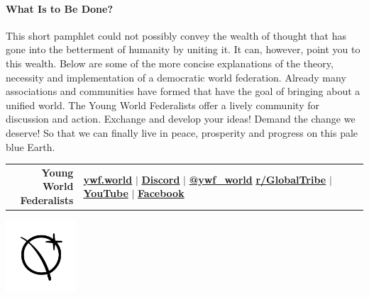 \documentclass[11pt,a4paper]{article}
\begin{document}
\paragraph{What Is to Be Done?}

This short pamphlet could not possibly convey the wealth of thought that has gone into the betterment of humanity by uniting it.
It can, however, point you to this wealth.
Below are some of the more concise explanations of the theory, necessity and implementation of a democratic world federation. Already many associations and communities have formed that have the goal of bringing about a unified world.
The Young World Federalists offer a lively community for discussion and action.
Exchange and develop your ideas!
Demand the change we deserve!
So that we can finally live in peace, prosperity and progress on this pale blue Earth.

\vspace{11pt}
\hline

\begin{multicols}{2}
\nocite{*}
\begingroup
{}
\setlength\bibitemsep{2pt}
\printbibliography[heading=none]
\endgroup
\end{multicols}

\begin{minipage}{.75\textwidth}
\begin{shaded*}
\begin{tabular}{r|l}
\makecell[r]{\large{\textbf{Young World}}\\ \large{\textbf{Federalists}}} & \makecell[l]{\textbf{\href{https://www.ywf.world}{ywf.world}} $\mid$ \textbf{\href{https://discord.gg/WyUkQps}{Discord}} $\mid$ \textbf{\href{https://twitter.com/ywf_world}{@ywf\_world}}\\  
\textbf{\href{https://www.reddit.com/r/GlobalTribe/}{r/GlobalTribe}} $\mid$ \textbf{\href{https://www.youtube.com/channel/UCBWca8XnMHF9EELWbz146pg}{YouTube}} $\mid$ \textbf{\href{https://www.facebook.com/YoungWorldFederalists/}{Facebook}}}
\end{tabular}

\end{shaded*}
\end{minipage}%
\begin{minipage}{0.25\textwidth}
\vspace{-30pt}
    \centering
    \includegraphics[height=100px]{ywf.png}

\end{minipage}
\end{document}
